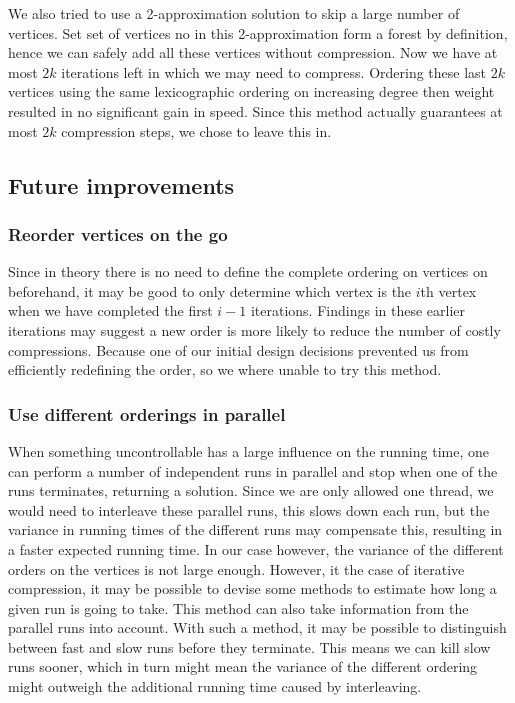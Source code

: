 We also tried to use a 2-approximation solution to skip a large number of vertices. Set set of vertices no in this 2-approximation form a forest by definition, hence we can safely add all these vertices without compression. Now we have at most $2k$ iterations left in which we may need to compress. Ordering these last $2k$ vertices using the same lexicographic ordering on increasing degree then weight resulted in no significant gain in speed. Since this method actually guarantees at most $2k$ compression steps, we chose to leave this in.

\subsection{Future improvements}
\subsubsection{Reorder vertices on the go}
Since in theory there is no need to define the complete ordering on vertices on beforehand, it may be good to only determine which vertex is the $i$th vertex when we have completed the first $i-1$ iterations. Findings in these earlier iterations may suggest a new order is more likely to reduce the number of costly compressions. Because one of our initial design decisions prevented us from efficiently redefining the order, so we where unable to try this method.

\subsubsection{Use different orderings in parallel}
When something uncontrollable has a large influence on the running time, one can perform a number of independent runs in parallel and stop when one of the runs terminates, returning a solution. Since we are only allowed one thread, we would need to interleave these parallel runs, this slows down each run, but the variance in running times of the different runs may compensate this, resulting in a faster expected running time. In our case however, the variance of the different orders on the vertices is not large enough. However, it the case of iterative compression, it may be possible to devise some methods to estimate how long a given run is going to take. This method can also take information from the parallel runs into account. With such a method, it may be possible to distinguish between fast and slow runs before they terminate. This means we can kill slow runs sooner, which in turn might mean the variance of the different ordering might outweigh the additional running time caused by interleaving.

